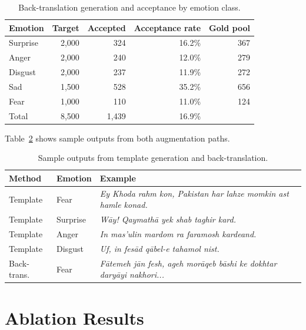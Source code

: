 \documentclass[11pt,a4paper]{article}
\begin{document}
\begin{table}[H]
\centering
\caption{Back-translation generation and acceptance by emotion class.}
\label{tab:bt_stats}
\begin{tabular}{@{}lrrrr@{}}
\toprule
Emotion & Target & Accepted & Acceptance rate & Gold pool \\
\midrule
Surprise & 2,000 & 324 & 16.2\% & 367 \\
Anger    & 2,000 & 240 & 12.0\% & 279 \\
Disgust  & 2,000 & 237 & 11.9\% & 272 \\
Sad      & 1,500 & 528 & 35.2\% & 656 \\
Fear     & 1,000 & 110 & 11.0\% & 124 \\
\midrule
Total    & 8,500 & 1,439 & 16.9\% & \\
\bottomrule
\end{tabular}
\end{table}

Table~\ref{tab:examples} shows sample outputs from both augmentation paths.

\begin{table}[H]
\centering
\caption{Sample outputs from template generation and back-translation.}
\label{tab:examples}
\small
\begin{tabular}{@{}p{2.2cm}p{1.5cm}p{8.5cm}@{}}
\toprule
Method & Emotion & Example \\
\midrule
Template & Fear & \textit{Ey Khoda rahm kon, Pakistan har lahze momkin ast hamle konad.} \\
Template & Surprise & \textit{Wāy! Qaymathā yek shab taghir kard.} \\
Template & Anger & \textit{In mas'ulin mardom ra faramosh kardeand.} \\
Template & Disgust & \textit{Uf, in fesād qābel-e tahamol nist.} \\
Back-trans. & Fear & \textit{Fātemeh jān fesh, ageh morāqeb bāshi ke dokhtar daryāyi nakhori...} \\
\bottomrule
\end{tabular}
\end{table}

\section{Ablation Results}
\label{sec:ablation}
\end{document}
